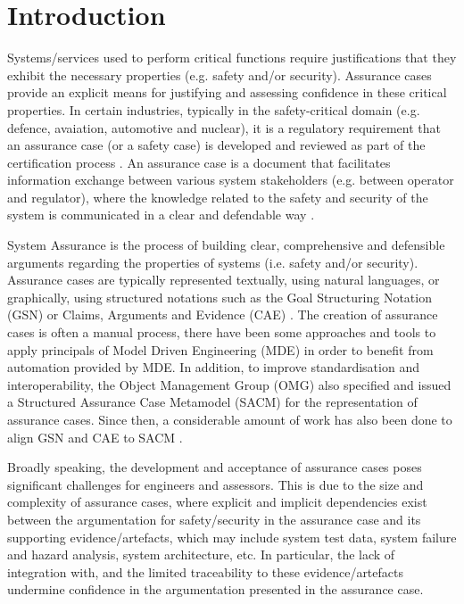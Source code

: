 \section{Introduction}
Systems/services used to perform critical functions require justifications that they exhibit the necessary properties (e.g. safety and/or security). Assurance cases provide an explicit means for justifying and assessing confidence in these critical properties. In certain industries, typically in the safety-critical domain (e.g. defence, avaiation, automotive and nuclear), it is a regulatory requirement that an assurance case (or a safety case) is developed and reviewed as part of the certification process \cite{healthFound}.
An assurance case is a document that facilitates information exchange between various system stakeholders (e.g. between operator and regulator), where the knowledge related to the safety and security of the system is communicated in a clear and defendable way \cite{}. 

System Assurance is the process of building clear, comprehensive and defensible arguments regarding the properties of systems (i.e. safety and/or security). 
Assurance cases are typically represented textually, using natural languages, or graphically, using structured notations such as the Goal Structuring Notation (GSN) \cite{} or Claims, Arguments and Evidence (CAE) \cite{}. 
The creation of assurance cases is often a manual process, there have been some approaches and tools to apply principals of Model Driven Engineering (MDE) in order to benefit from automation provided by MDE. 
In addition, to improve standardisation and interoperability, the Object Management Group (OMG) also specified and issued a Structured Assurance Case Metamodel (SACM) for the representation of assurance cases. 
Since then, a considerable amount of work has also been done to align GSN and CAE to SACM \cite{}. 

Broadly speaking, the development and acceptance of assurance cases poses significant challenges for engineers and assessors. This is due to the size and complexity of assurance cases, where explicit and implicit dependencies exist between the argumentation for safety/security in the assurance case and its supporting evidence/artefacts, which may include system test data, system failure and hazard analysis, system architecture, etc. In particular, the lack of integration with, and the limited traceability to these evidence/artefacts undermine confidence in the argumentation presented in the assurance case. 

